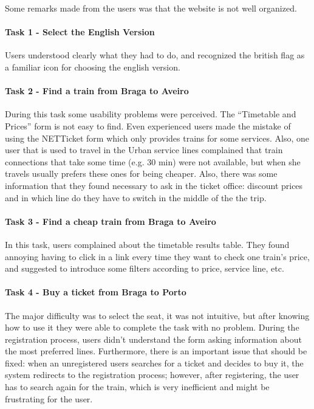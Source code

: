 \documentclass[a4paper]{article}
\begin{document}
Some remarks made from the users was that the website is not well organized.

\paragraph{Task 1 - Select the English Version} Users understood clearly what they had to do, and recognized the british flag as a familiar icon for choosing the english version.

\paragraph{Task 2 - Find a train from Braga to Aveiro} During this task some usability problems were perceived. The ``Timetable and Prices'' form is not easy to find. Even experienced users made the mistake of using the NETTicket form which only provides trains for some services. Also, one user that is used to travel in the Urban service lines complained that train connections that take some time (e.g. 30 min) were not available, but when she travels usually prefers these ones for being cheaper. Also, there was some information that they found necessary to ask in the ticket office: discount prices and in which line do they have to switch in the middle of the the trip.

\paragraph{Task 3 - Find a cheap train from Braga to Aveiro} In this task, users complained about the timetable results table. They found annoying having to click in a link every time they want to check one train's price, and suggested to introduce some filters according to price, service line, etc.
 
\paragraph{Task 4 - Buy a ticket from Braga to Porto} The major difficulty was to select the seat, it was not intuitive, but after knowing how to use it they were able to complete the task with no problem. During the registration process, users didn't understand the form asking information about the most preferred lines. Furthermore, there is an important issue that should be fixed: when an unregistered users searches for a ticket and decides to buy it, the system redirects to the registration process; however, after registering, the user has to search again for the train, which is very inefficient and might be frustrating for the user.
\end{document}
